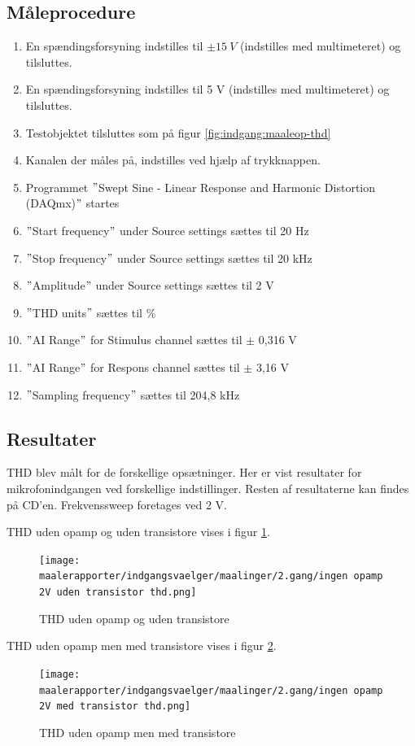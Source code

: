 \subsection*{Måleprocedure}
\begin{enumerate}
\item En spændingsforsyning indstilles til $\pm15~V$ (indstilles med multimeteret) og tilsluttes.
\item En spændingsforsyning indstilles til 5 V (indstilles med multimeteret) og tilsluttes.
\item Testobjektet tilsluttes som på figur \ref{fig:indgang:maaleop-thd}
\item Kanalen der måles på, indstilles ved hjælp af trykknappen.
\item Programmet $"$Swept Sine - Linear Response and Harmonic Distortion (DAQmx)$"$ startes
\item $"$Start frequency$"$ under Source settings sættes til 20 Hz
\item $"$Stop frequency$"$ under Source settings sættes til 20 kHz
\item $"$Amplitude$"$ under Source settings sættes til 2 V
\item $"$THD units$"$ sættes til \%
\item $"$AI Range$"$ for Stimulus channel sættes til $\pm$ 0,316 V
\item $"$AI Range$"$ for Respons channel sættes til $\pm$ 3,16 V
\item $"$Sampling frequency$"$ sættes til 204,8 kHz
\end{enumerate}

\subsection*{Resultater}

THD blev målt for de forskellige opsætninger. Her er vist resultater for mikrofonindgangen ved forskellige indstillinger. Resten af resultaterne kan findes på CD'en. Frekvenssweep foretages ved 2 V.

THD uden opamp og uden transistore vises i figur \ref{fig:apind:uoput}.
\begin{figure}[h]
\centering
\texttt{[image: maalerapporter/indgangsvaelger/maalinger/2.gang/ingen opamp 2V uden transistor thd.png]}
\caption{THD uden opamp og uden transistore}
\label{fig:apind:uoput}
\end{figure}

THD uden opamp men med transistore vises i figur \ref{fig:apind:uopmt}.
\begin{figure}[h]
\centering
\texttt{[image: maalerapporter/indgangsvaelger/maalinger/2.gang/ingen opamp 2V med transistor thd.png]}
\caption{THD uden opamp men med transistore}
\label{fig:apind:uopmt}
\end{figure}

